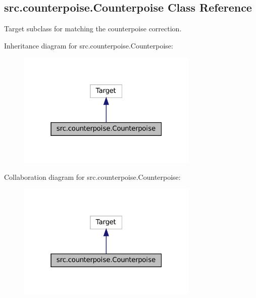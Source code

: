 \hypertarget{classsrc_1_1counterpoise_1_1Counterpoise}{}\subsection{src.\+counterpoise.\+Counterpoise Class Reference}
\label{classsrc_1_1counterpoise_1_1Counterpoise}


Target subclass for matching the counterpoise correction.  




Inheritance diagram for src.\+counterpoise.\+Counterpoise\+:
\nopagebreak
\begin{figure}[H]
\begin{center}
\leavevmode
\includegraphics[width=244pt]{classsrc_1_1counterpoise_1_1Counterpoise__inherit__graph}
\end{center}
\end{figure}


Collaboration diagram for src.\+counterpoise.\+Counterpoise\+:
\nopagebreak
\begin{figure}[H]
\begin{center}
\leavevmode
\includegraphics[width=244pt]{classsrc_1_1counterpoise_1_1Counterpoise__coll__graph}
\end{center}
\end{figure}

